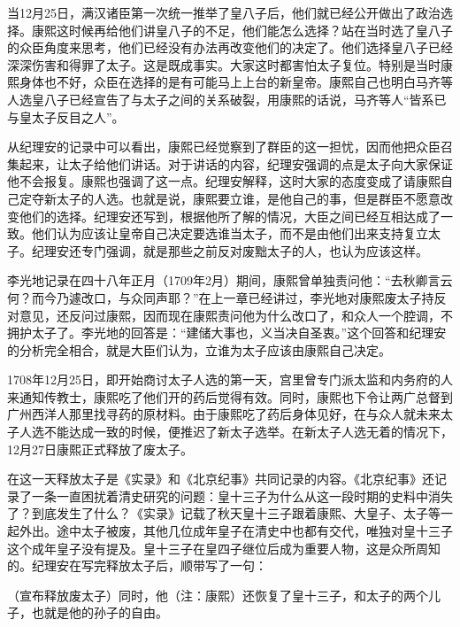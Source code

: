 当12月25日，满汉诸臣第一次统一推举了皇八子后，他们就已经公开做出了政治选择。康熙这时候再给他们讲皇八子的不足，他们能怎么选择？站在当时选了皇八子的众臣角度来思考，他们已经没有办法再改变他们的决定了。他们选择皇八子已经深深伤害和得罪了太子。这是既成事实。大家这时都害怕太子复位。特别是当时康熙身体也不好，众臣在选择的是有可能马上上台的新皇帝。康熙自己也明白马齐等人选皇八子已经宣告了与太子之间的关系破裂，用康熙的话说，马齐等人“皆系已与皇太子反目之人”。



从纪理安的记录中可以看出，康熙已经觉察到了群臣的这一担忧，因而他把众臣召集起来，让太子给他们讲话。对于讲话的内容，纪理安强调的点是太子向大家保证他不会报复。康熙也强调了这一点。纪理安解释，这时大家的态度变成了请康熙自己定夺新太子的人选。也就是说，康熙要立谁，是他自己的事，但是群臣不愿意改变他们的选择。纪理安还写到，根据他所了解的情况，大臣之间已经互相达成了一致。他们认为应该让皇帝自己决定要选谁当太子，而不是由他们出来支持复立太子。纪理安还专门强调，就是那些之前反对废黜太子的人，也认为应该这样。



李光地记录在四十八年正月（1709年2月）期间，康熙曾单独责问他：“去秋卿言云何？而今乃遽改口，与众同声耶？”在上一章已经讲过，李光地对康熙废太子持反对意见，还反问过康熙，因而现在康熙责问他为什么改口了，和众人一个腔调，不拥护太子了。李光地的回答是：“建储大事也，义当决自圣衷。”这个回答和纪理安的分析完全相合，就是大臣们认为，立谁为太子应该由康熙自己决定。



1708年12月25日，即开始商讨太子人选的第一天，宫里曾专门派太监和内务府的人来通知传教士，康熙吃了他们开的药后觉得有效。同时，康熙也下令让两广总督到广州西洋人那里找寻药的原材料。由于康熙吃了药后身体见好，在与众人就未来太子人选不能达成一致的时候，便推迟了新太子选举。在新太子人选无着的情况下，12月27日康熙正式释放了废太子。



在这一天释放太子是《实录》和《北京纪事》共同记录的内容。《北京纪事》还记录了一条一直困扰着清史研究的问题：皇十三子为什么从这一段时期的史料中消失了？到底发生了什么？《实录》记载了秋天皇十三子跟着康熙、大皇子、太子等一起外出。途中太子被废，其他几位成年皇子在清史中也都有交代，唯独对皇十三子这个成年皇子没有提及。皇十三子在皇四子继位后成为重要人物，这是众所周知的。纪理安在写完释放太子后，顺带写了一句：



\begin{bookquote}（宣布释放废太子）同时，他（注：康熙）还恢复了皇十三子，和太子的两个儿子，也就是他的孙子的自由。\end{bookquote}

